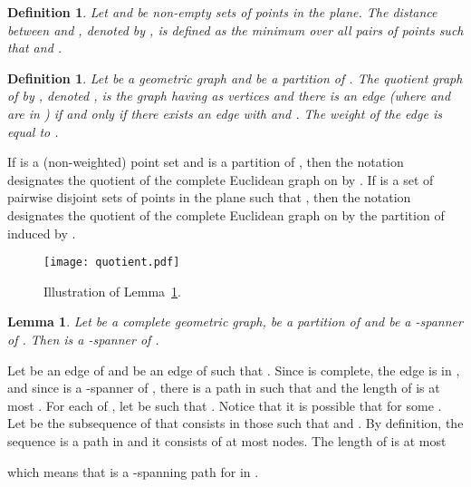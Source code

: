 \documentclass[pdftex,leqno,fleqn,12pt]{article}
\newtheorem{lemma}[theorem]{Lemma}
\newtheorem{definition}[theorem]{Definition}
\newenvironment{proof}{{\textit Proof:} \rm}{\hfill  \medskip\\}
\newcommand{\old}[1]{{}}
\begin{document}
\begin{definition} Let  and  be non-empty sets of points in the plane.
The \emph{distance} between  and , denoted by , is defined as the minimum 
over all pairs of points such that  and .
\end{definition}

\begin{definition}Let  be a geometric graph
and  be a partition of . The \emph{quotient graph} of  by , denoted
, is the graph having  as vertices and there is an edge  (where
 and  are in ) if and only if there exists an edge  with 
and . The weight of the edge  is equal to .
\end{definition}

If  is a (non-weighted) point set and  is a partition of , then the notation
 designates the quotient of the complete Euclidean graph on  by . If
 is a set of pairwise disjoint sets of points in the plane such that , then the notation  designates the quotient of the complete
Euclidean graph on  by the partition of  induced by .

\begin{figure}
\centering
\texttt{[image: quotient.pdf]}
\caption{Illustration of Lemma~\ref{thm-quotient}.}
\end{figure}

\begin{lemma}\label{thm-quotient}Let 
be a complete geometric graph,  be a partition of  and  be a -spanner of .
Then  is a -spanner of .
\end{lemma}
\old{
\begin{proof} Let  be an edge of  and 
be an edge of  such that . Since  is complete, the edge  is in , and
since  is a -spanner of , there is a path  in  such that
 and the length of  is at most . By definition,  contains
a path  such that  and . The length of  is at most

which means that  is a -spanning path for  in .
\end{proof}
}
\begin{proof} Let  be an edge of  and 
be an edge of  such that . Since  is complete, the edge  is in , and
since  is a -spanner of , there is a path  in  such that
 and the length of  is at most .  For each  of , let
 be such that . Notice that it is possible that  for
some . Let  be the subsequence of  that consists in those  such
that  and . By definition, the sequence  is a path in 
and it consists of at most  nodes. The length of  is at most

which means that  is a -spanning path for  in .
\end{proof}
\end{document}
